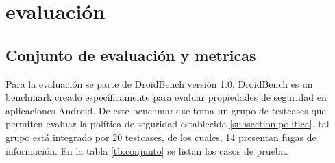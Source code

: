 \section{evaluación}
\subsection{Conjunto de evaluación y metricas}
Para la evaluación se parte de DroidBench versión
1.0\cite{DroidBenchBenchmarks}, DroidBench es un benchmark creado
específicamente para evaluar propiedades de seguridad en aplicaciones Android.
De este benchmark se toma un grupo de testcases que permiten evaluar la política
de seguridad establecida \ref{subsection:politica}, tal grupo está integrado por
20 testcases, de los cuales, 14 presentan fugas de información. En la tabla
\ref{tb:conjunto} se listan los casos de prueba.
\begin{table}[t]
\begin{center}
\small
{}
\end{center}
\caption{Conjunto de evaluación.\newline
Donde \textit{Item} identifica el testcase y \textit{Testcase} especifica el
nombre de la aplicación para el caso de prueba}
\label{tb:conjunto}
\end{table}
